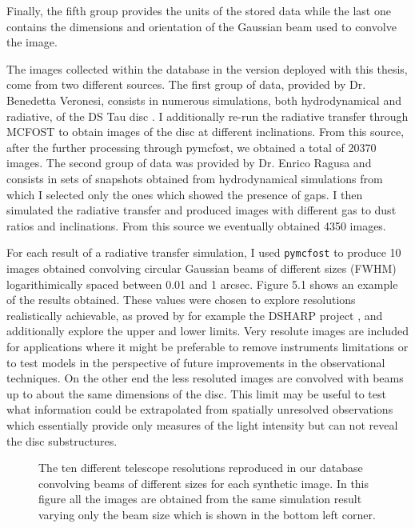 \documentclass[a4paper,10pt]{report}
\begin{document}
Finally, the fifth group provides the units of the stored data while the last one contains
the dimensions and orientation of the Gaussian beam used to convolve the image.

The images collected within the database in the version deployed with this thesis, come from two different sources.
The first group of data, provided by Dr. Benedetta Veronesi, consists in numerous simulations,
both hydrodynamical and radiative,
of the DS Tau disc \citep{dstauv}. 
I additionally re-run the radiative transfer through MCFOST to obtain images of the disc at different inclinations.
From this source, after the further processing through pymcfost, we obtained a total of 20370 images.
The second group of data was provided by Dr. Enrico Ragusa and consists in sets of snapshots
obtained from hydrodynamical simulations from which I selected only the ones which showed the presence of gaps.
I then simulated the radiative transfer and produced images with different gas to dust ratios and inclinations.
From this source we eventually obtained 4350 images.

For each result of a radiative transfer simulation, I used \lstinline{pymcfost} to produce 10 images obtained convolving circular 
Gaussian beams of different sizes (FWHM)
logarithimically spaced between 0.01 and 1 arcsec. Figure 5.1 shows an example of the results obtained.
These values were chosen to explore resolutions
realistically achievable, as proved by for example the DSHARP project \citep{dsharp}, and additionally explore the upper and lower limits.
Very resolute images are included for applications where it might be preferable to remove instruments limitations
or to test models in the perspective of future improvements in the observational techniques. 
On the other end the less resoluted images are convolved with beams up to about the same dimensions of the disc. 
This limit may be useful to test what information could be extrapolated from spatially unresolved observations
which essentially provide only measures of the light intensity but can not reveal the disc substructures.

\begin{figure}
    \begin{center}
        \scalebox{0.4}{}
    \end{center}
    \caption{The ten different telescope resolutions reproduced in our database 
    convolving beams of different sizes for each synthetic image. 
    In this figure all the images are obtained from the same simulation result varying only the
    beam size which
    is shown in the bottom left corner.}
\end{figure}
\end{document}
